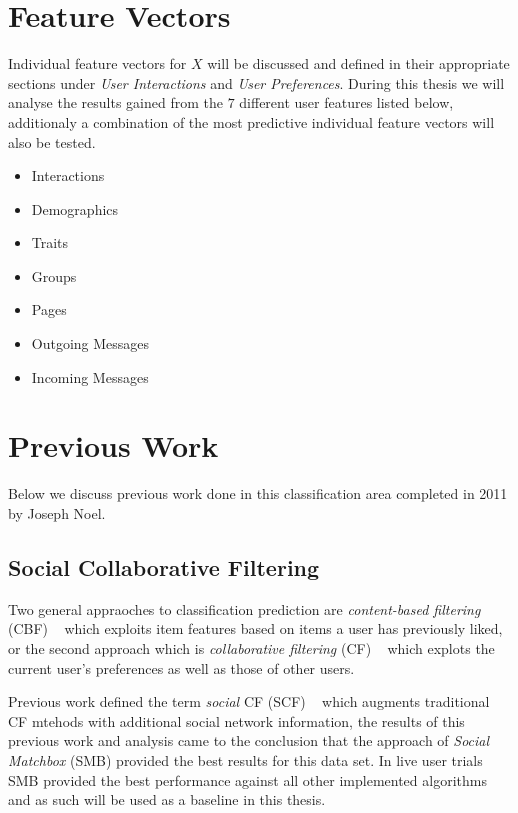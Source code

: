 \section{Feature Vectors}
\label{sec:features}

Individual feature vectors for $X$ will be discussed and defined in their appropriate sections under \emph{User Interactions} and 
\emph{User Preferences}. During this thesis we will analyse the results gained from the $7$ different user features listed below, 
additionaly a combination of the most predictive individual feature vectors will also be tested.

\begin{itemize}
\item Interactions
\item Demographics
\item Traits
\item Groups
\item Pages
\item Outgoing Messages
\item Incoming Messages
\end{itemize}

\section{Previous Work}
\label{sec:pw}

Below we discuss previous work done in this classification area completed in 2011 by Joseph Noel.

\subsection{Social Collaborative Filtering}
\label{sec:cbf}

Two general appraoches to classification prediction are \emph{content-based filtering} (CBF) ~\cite{newsweeder} which exploits 
item features based on items a user has previously liked, or the second approach which is \emph{collaborative filtering} (CF) 
~\cite{collab_filtering} which explots the current user's preferences as well as those of other users.

Previous work defined the term \emph{social} CF (SCF) ~\cite{joseph} which augments traditional CF mtehods with additional social 
network information, the results of this previous work and analysis came to the conclusion that the approach of \emph{Social Matchbox} (SMB)
provided the best results for this data set. In live user trials SMB provided the best performance against all other implemented 
algorithms and as such will be used as a baseline in this thesis.

